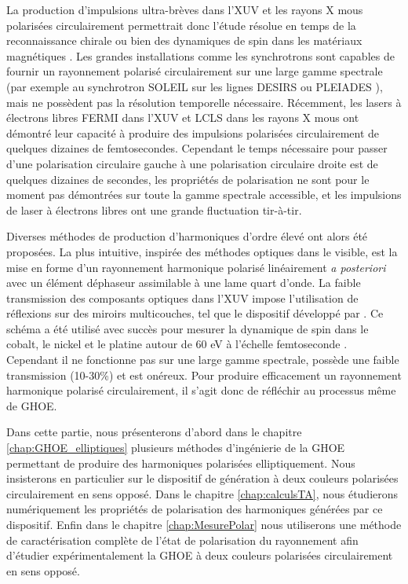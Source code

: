 La production d'impulsions ultra-brèves dans l'XUV et les rayons X mous polarisées circulairement permettrait donc l'étude résolue en temps de la reconnaissance chirale  ou bien des dynamiques de spin dans les matériaux magnétiques . Les grandes installations comme les synchrotrons sont capables de fournir un rayonnement polarisé circulairement sur une large gamme spectrale (par exemple au synchrotron SOLEIL sur les lignes DESIRS  ou PLEIADES ), mais ne possèdent pas la résolution temporelle nécessaire. Récemment, les lasers à électrons libres FERMI dans l'XUV  et LCLS dans les rayons X mous  ont démontré leur capacité à produire des impulsions polarisées circulairement de quelques dizaines de femtosecondes. Cependant le temps nécessaire pour passer d'une polarisation circulaire gauche à une polarisation circulaire droite est de quelques dizaines de secondes, les propriétés de polarisation ne sont pour le moment pas démontrées sur toute la gamme spectrale accessible, et les impulsions de laser à électrons libres ont une grande fluctuation tir-à-tir.

Diverses méthodes de production d'harmoniques d'ordre élevé ont alors été proposées. La plus intuitive, inspirée des méthodes optiques dans le visible, est la mise en forme d'un rayonnement harmonique polarisé linéairement \textit{a posteriori} avec un élément déphaseur assimilable à une lame quart d'onde. La faible transmission des composants optiques dans l'XUV impose l'utilisation de réflexions sur des miroirs multicouches, tel que le dispositif développé par . Ce schéma a été utilisé avec succès pour mesurer la dynamique de spin dans le cobalt, le nickel et le platine autour de 60 eV à l'échelle femtoseconde . Cependant il ne fonctionne pas sur une large gamme spectrale, possède une faible transmission (10-30\%) et est onéreux. Pour produire efficacement un rayonnement harmonique polarisé circulairement, il s'agit donc de réfléchir au processus même de GHOE.

Dans cette partie, nous présenterons d'abord dans le chapitre \ref{chap:GHOE_elliptiques} plusieurs méthodes d'ingénierie de la GHOE permettant de produire des harmoniques polarisées elliptiquement. Nous insisterons en particulier sur le dispositif de génération à deux couleurs polarisées circulairement en sens opposé. Dans le chapitre \ref{chap:calculsTA}, nous étudierons numériquement les propriétés de polarisation des harmoniques générées par ce dispositif. Enfin dans le chapitre \ref{chap:MesurePolar} nous utiliserons une méthode de caractérisation complète de l'état de polarisation du rayonnement afin d'étudier expérimentalement la GHOE à deux couleurs polarisées circulairement en sens opposé.

